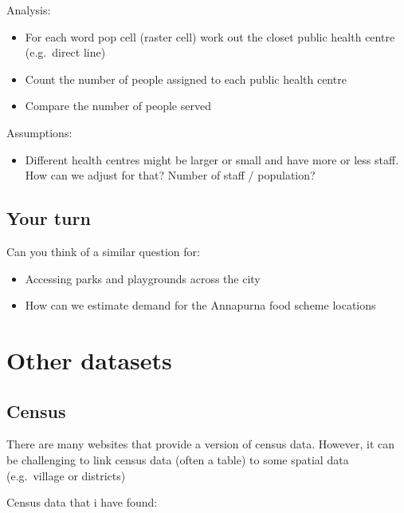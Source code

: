 \documentclass[
  letterpaper,
]{scrbook}
\providecommand{\tightlist}{%
  \setlength{\itemsep}{0pt}\setlength{\parskip}{0pt}}\usepackage{longtable,booktabs,array}
\begin{document}
\begin{itemize}
  Analysis:

  \begin{itemize}
  \tightlist
  \item
    For each word pop cell (raster cell) work out the closet public
    health centre (e.g.~direct line)
  \item
    Count the number of people assigned to each public health centre
  \item
    Compare the number of people served
  \end{itemize}

  Assumptions:

  \begin{itemize}
  \tightlist
  \item
    Different health centres might be larger or small and have more or
    less staff. How can we adjust for that? Number of staff /
    population?
  \end{itemize}
\end{itemize}

\hypertarget{your-turn}{%
\section{Your turn}\label{your-turn}}

Can you think of a similar question for:

\begin{itemize}
\tightlist
\item
  Accessing parks and playgrounds across the city
\item
  How can we estimate demand for the Annapurna food scheme locations
\end{itemize}


\hypertarget{other-datasets}{%
\chapter{Other datasets}\label{other-datasets}}

\hypertarget{census}{%
\section{Census}\label{census}}

There are many websites that provide a version of census data. However,
it can be challenging to link census data (often a table) to some
spatial data (e.g.~village or districts)

Census data that i have found:
\end{document}
